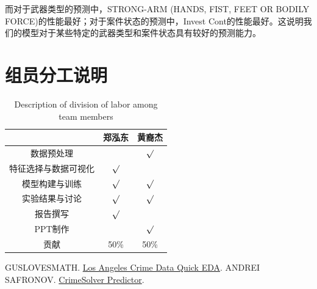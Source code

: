 \documentclass{article}
\begin{document}
而对于武器类型的预测中，STRONG-ARM (HANDS, FIST, FEET OR BODILY FORCE)的性能最好；对于案件状态的预测中，Invest Cont的性能最好。这说明我们的模型对于某些特定的武器类型和案件状态具有较好的预测能力。

\section{组员分工说明}

\begin{table}[H]
    \centering
    \begin{tabular}{|c|c|c|}
        \hline
                   & 郑泓东     & 黄裔杰     \\
        \hline
        数据预处理      &         & $\surd$ \\
        \hline
        特征选择与数据可视化 & $\surd$ &         \\
        \hline
        模型构建与训练    & $\surd$ & $\surd$ \\
        \hline
        实验结果与讨论    & $\surd$ & $\surd$ \\
        \hline
        报告撰写       & $\surd$ &         \\
        \hline
        PPT制作      &         & $\surd$ \\
        \hline
        贡献         & 50\%    & 50\%    \\
        \hline
    \end{tabular}
    \caption{Description of division of labor among team members}
    \label{tab:division_of_labor}
\end{table}

\begin{thebibliography}{99}
     GUSLOVESMATH. \href{https://www.kaggle.com/code/guslovesmath/los-angeles-crime-data-quick-eda}{Los Angeles Crime Data Quick EDA}.
     ANDREI SAFRONOV. \href{https://www.kaggle.com/code/safronov00/crimesolver-predictor#2.-Clean-Data}{CrimeSolver Predictor}.
\end{thebibliography}
\end{document}
